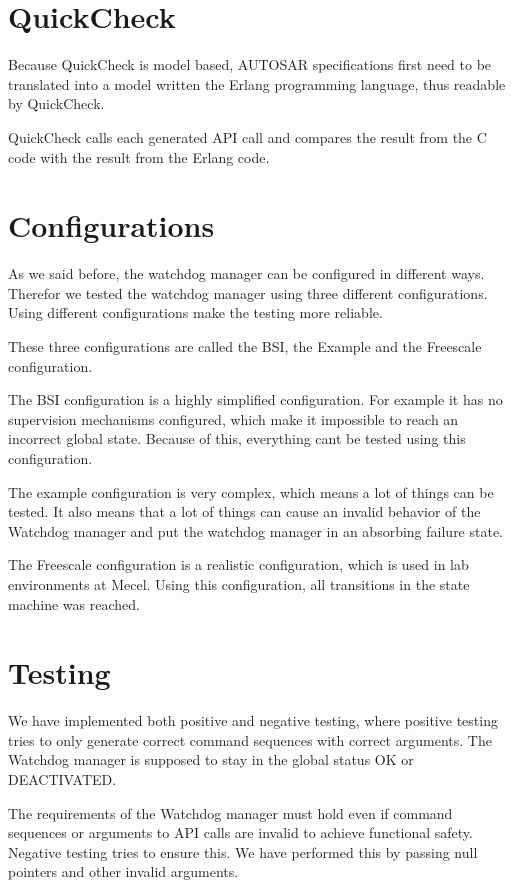 \documentclass[a4paper]{article}
\begin{document}
\section{QuickCheck}
Because QuickCheck is model based, AUTOSAR specifications first need
to be translated into a model written the Erlang programming language,
thus readable by QuickCheck.

QuickCheck calls each generated API call and compares the result from
the C code with the result from the Erlang code.

\section{Configurations}
As we said before, the watchdog manager can be configured in different
ways. Therefor we tested the watchdog manager using three different
configurations. Using different configurations make the testing more
reliable.

These three configurations are called the BSI, the Example and the
Freescale configuration.

The BSI configuration is a highly simplified configuration. For
example it has no supervision mechanisms configured, which make it
impossible to reach an incorrect global state.
Because of this, everything cant be tested using this configuration.

The example configuration is very complex, which means a lot of things
can be tested. It also means that a lot of things can cause an invalid
behavior of the Watchdog manager and put the watchdog manager in an
absorbing failure state.

The Freescale configuration is a realistic configuration, which is
used in lab environments at Mecel. Using this configuration, all
transitions in the state machine was reached.

\section{Testing}
We have implemented both positive and negative testing, where positive
testing tries to only generate correct command sequences with correct
arguments. The Watchdog manager is supposed to stay in the global
status OK or DEACTIVATED.

The requirements of the Watchdog manager must hold even if command
sequences or arguments to API calls are invalid to achieve functional
safety. Negative testing tries to ensure this. We have performed this
by passing null pointers and other invalid arguments.
\end{document}
